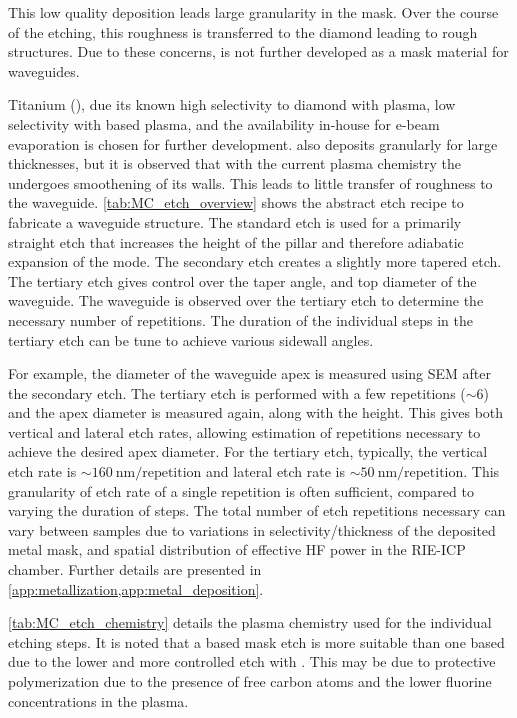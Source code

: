 This low quality deposition leads large granularity in the mask. Over the course of the etching, this roughness is transferred to the diamond leading to rough structures. Due to these concerns,  is not further developed as a mask material for waveguides.

Titanium (), due its known high selectivity to diamond with  plasma, low selectivity with  based plasma, and the availability in-house for e-beam evaporation is chosen for further development.  also deposits granularly for large thicknesses, but it is observed that with the current plasma chemistry the  undergoes smoothening of its walls. This leads to little transfer of roughness to the waveguide. \cref{tab:MC_etch_overview} shows the abstract etch recipe to fabricate a waveguide structure. The standard etch is used for a primarily straight etch that increases the height of the pillar and therefore adiabatic expansion of the mode. The secondary etch creates a slightly more tapered etch. The tertiary etch gives control over the taper angle, and top diameter of the waveguide. The waveguide is observed over the tertiary etch to determine the necessary number of repetitions. The duration of the individual steps in the tertiary etch can be tune to achieve various sidewall angles. 

For example, the diameter of the waveguide apex is measured using \gls{SEM} after the secondary etch. The tertiary etch is performed with a few repetitions ($\sim6$) and the apex diameter is measured again, along with the height. This gives both vertical and lateral etch rates, allowing estimation of repetitions necessary to achieve the desired apex diameter. For the tertiary etch, typically, the vertical etch rate is $\sim\qty{160}{\nano\meter}/\text{repetition}$ and lateral etch rate is $\sim\qty{50}{\nano\meter}/\text{repetition}$. This granularity of etch rate of a single repetition is often sufficient, compared to varying the duration of steps. The total number of etch repetitions necessary can vary between samples due to variations in selectivity/thickness of the deposited metal mask, and spatial distribution of effective \gls{HF} power in the \gls{RIE}-\gls{ICP} chamber\cite{chengImprovingFrontSide2012}. Further details are presented in \cref{app:metallization,app:metal_deposition}.


\cref{tab:MC_etch_chemistry} details the plasma chemistry used for the individual etching steps. It is noted that a  based mask etch is more suitable than one  based due to the lower and more controlled etch with . This may be due to protective polymerization due to the presence of free carbon atoms\cite{eiseleSF6Preferable1981} and the lower fluorine concentrations in the  plasma\cite{tangTungstenEtchingCF1984}.

